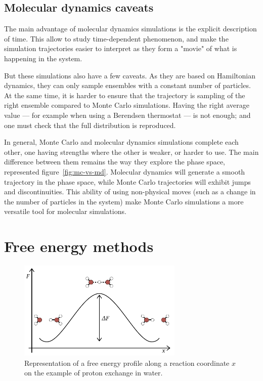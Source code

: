 \documentclass[thesis]{subfiles}
\begin{document}
\subsection{Molecular dynamics caveats}

The main advantage of molecular dynamics simulations is the explicit description
of time. This allow to study time-dependent phenomenon, and make the simulation
trajectories easier to interpret as they form a "movie" of what is happening in
the system.

But these simulations also have a few caveats. As they are based on Hamiltonian
dynamics, they can only sample ensembles with a constant number of particles.
At the same time, it is harder to ensure that the trajectory is sampling of the
right ensemble compared to Monte Carlo simulations. Having the right average
value --- for example when using a Berendsen thermostat --- is not enough; and
one must check that the full distribution is reproduced.

In general, Monte Carlo and molecular dynamics simulations complete each other,
one having strengths where the other is weaker, or harder to use. The main
difference between them remains the way they explore the phase space,
represented figure~\ref{fig:mc-vs-md}. Molecular dynamics will generate a smooth
trajectory in the phase space, while Monte Carlo trajectories will exhibit jumps
and discontinuities. This ability of using non-physical moves (such as a change
in the number of particles in the system) make Monte Carlo simulations a more
versatile tool for molecular simulations.

\newpage
\section{Free energy methods}

\begin{figure}[ht]
    \centering
    \includegraphics[width=0.7\textwidth]{figures/images/free-energy-profile}
    \caption{Representation of a free energy profile along a reaction
    coordinate $x$ on the example of proton exchange in water.}
    \label{fig:free-energy-profile}
\end{figure}
\end{document}
